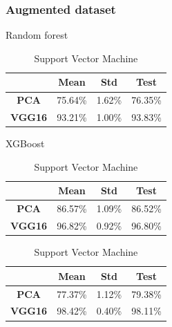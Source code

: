 \documentclass[aspectratio=169]{beamer}
\begin{document}
\begin{frame}
  \frametitle{Augmented dataset}

  \begin{table}
    \centering
    \captionsetup{labelformat=empty}
    \caption{Random forest}
    \begin{tabular}{|c|c|c|c|}
    \hline
       & Mean & Std & Test \\
      \hline
      \textbf{PCA} & 75.64\% & 1.62\% & 76.35\% \\
      \hline
      \textbf{VGG16} & 93.21\% & 1.00\% & 93.83\% \\
      \hline
    \end{tabular}

    \centering
    \captionsetup{labelformat=empty}
    \caption{XGBoost}
    \begin{tabular}{|c|c|c|c|}
    \hline
       & Mean & Std & Test \\
      \hline
      \textbf{PCA} & 86.57\% & 1.09\% & 86.52\% \\
      \hline
      \textbf{VGG16} & 96.82\% & 0.92\% & 96.80\% \\
      \hline
    \end{tabular}


    \centering
    \captionsetup{labelformat=empty}
    \caption{Support Vector Machine}
    \begin{tabular}{|c|c|c|c|}
    \hline
       & Mean & Std & Test \\
      \hline
      \textbf{PCA} & 77.37\% & 1.12\% & 79.38\% \\
      \hline
      \textbf{VGG16} & 98.42\% & 0.40\% & 98.11\% \\
      \hline
    \end{tabular}
  \end{table}

  

\end{frame}
\end{document}
